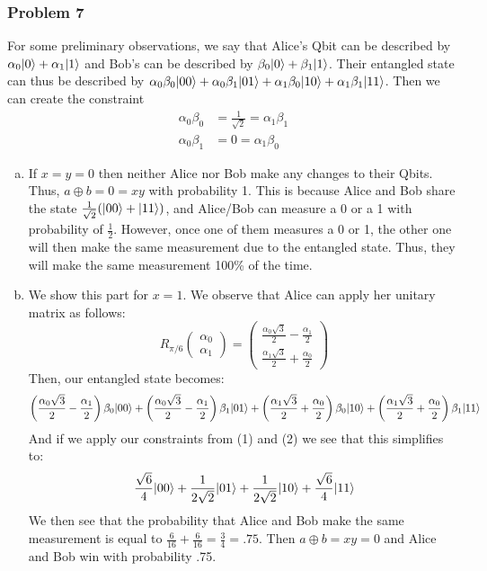 \documentclass[a4paper,11pt]{article}
\begin{document}
\subsubsection*{Problem 7}
For some preliminary observations, we say that Alice's Qbit can be described by $\alpha_0{\left\vert{0}\right\rangle}+\alpha_1{\left\vert{1}\right\rangle}$ and Bob's can be described by $\beta_0{\left\vert{0}\right\rangle}+\beta_1{\left\vert{1}\right\rangle}$. Their entangled state can thus be described by $\alpha_0\beta_0{\left\vert{00}\right\rangle}+\alpha_0\beta_1{\left\vert{01}\right\rangle}+\alpha_1\beta_0{\left\vert{10}\right\rangle}+\alpha_1\beta_1{\left\vert{11}\right\rangle}$. Then we can create the constraint \begin{align}
    \alpha_0\beta_0&=\frac{1}{\sqrt{2}}=\alpha_1\beta_1\\
    \alpha_0\beta_1&=0=\alpha_1\beta_0
\end{align}
\begin{enumerate}[a)]
    \item If $x=y=0$ then neither Alice nor Bob make any changes to their Qbits. Thus, $a\oplus b=0=xy$ with probability 1. This is because Alice and Bob share the state $\frac{1}{\sqrt{2}}({\left\vert{00}\right\rangle}+{\left\vert{11}\right\rangle})$, and Alice/Bob can measure a 0 or a 1 with probability of $\frac{1}{2}$. However, once one of them measures a 0 or 1, the other one will then make the same measurement due to the entangled state. Thus, they will make the same measurement 100\% of the time.
    \item We show this part for $x=1$. We observe that Alice can apply her unitary matrix as follows:
        $$R_{\pi/6}\left(\begin{array}{c} \alpha_0 \\ \alpha_1\end{array}\right)=\left(\begin{array}{c} \frac{\alpha_0\sqrt{3}}{2}-\frac{\alpha_1}{2} \\ \frac{\alpha_1\sqrt{3}}{2}+\frac{\alpha_0}{2}\end{array}\right)$$
        Then, our entangled state becomes:
        $$\left(\frac{\alpha_0\sqrt{3}}{2}-\frac{\alpha_1}{2}\right)\beta_0{\left\vert{00}\right\rangle}+\left(\frac{\alpha_0\sqrt{3}}{2}-\frac{\alpha_1}{2}\right)\beta_1{\left\vert{01}\right\rangle}+\left(\frac{\alpha_1\sqrt{3}}{2}+\frac{\alpha_0}{2}\right)\beta_0{\left\vert{10}\right\rangle}+\left(\frac{\alpha_1\sqrt{3}}{2}+\frac{\alpha_0}{2}\right)\beta_1{\left\vert{11}\right\rangle}$$
        And if we apply our constraints from (1) and (2) we see that this simplifies to:
        $$\frac{\sqrt{6}}{4}{\left\vert{00}\right\rangle}+\frac{1}{2\sqrt{2}}{\left\vert{01}\right\rangle}+\frac{1}{2\sqrt{2}}{\left\vert{10}\right\rangle}+\frac{\sqrt{6}}{4}{\left\vert{11}\right\rangle}$$
        We then see that the probability that Alice and Bob make the same measurement is equal to $\frac{6}{16}+\frac{6}{16}=\frac{3}{4}=.75$. Then $a\oplus b = xy = 0$ and Alice and Bob win with probability .75.

\end{enumerate}
\end{document}
